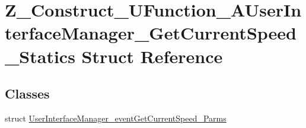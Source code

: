 \hypertarget{struct_z___construct___u_function___a_user_interface_manager___get_current_speed___statics}{}\section{Z\+\_\+\+Construct\+\_\+\+U\+Function\+\_\+\+A\+User\+Interface\+Manager\+\_\+\+Get\+Current\+Speed\+\_\+\+Statics Struct Reference}
\label{struct_z___construct___u_function___a_user_interface_manager___get_current_speed___statics}
\subsection*{Classes}
\begin{DoxyCompactItemize}
\item 
struct \mbox{\hyperlink{struct_z___construct___u_function___a_user_interface_manager___get_current_speed___statics_1_1_ubc346b0ed869520295c1fcbac47fc630}{User\+Interface\+Manager\+\_\+event\+Get\+Current\+Speed\+\_\+\+Parms}}
\end{DoxyCompactItemize}
